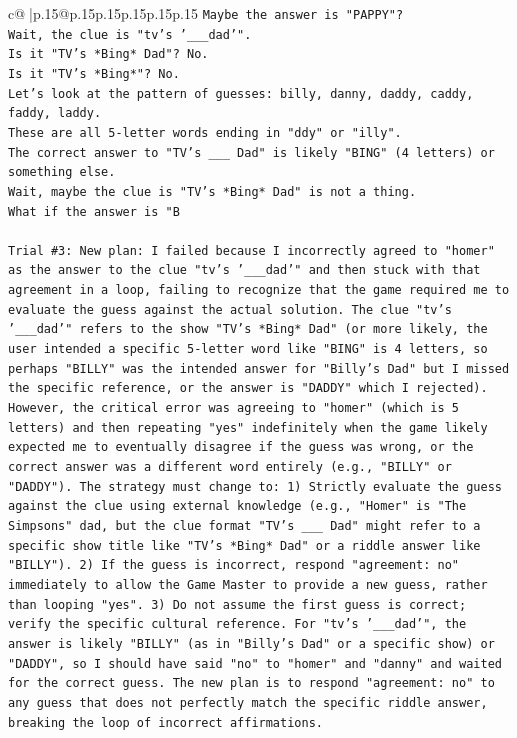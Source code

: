 \documentclass{article}
\begin{document}
{\begin{supertabular}{c@{$\;$}|p{.15\linewidth}@{}p{.15\linewidth}p{.15\linewidth}p{.15\linewidth}p{.15\linewidth}p{.15\linewidth}}
{{{\texttt{Maybe the answer is "PAPPY"?} \\
\texttt{Wait, the clue is "tv's '\_\_\_dad'".} \\
\texttt{Is it "TV's *Bing* Dad"? No.} \\
\texttt{Is it "TV's *Bing*"? No.} \\
\texttt{Let's look at the pattern of guesses: billy, danny, daddy, caddy, faddy, laddy.} \\
\texttt{These are all 5{-}letter words ending in "ddy" or "illy".} \\
\texttt{The correct answer to "TV's \_\_\_ Dad" is likely "BING" (4 letters) or something else.} \\
\texttt{Wait, maybe the clue is "TV's *Bing* Dad" is not a thing.} \\
\texttt{What if the answer is "B} \\
\\ 
\texttt{Trial \#3: New plan: I failed because I incorrectly agreed to "homer" as the answer to the clue "tv's '\_\_\_dad'" and then stuck with that agreement in a loop, failing to recognize that the game required me to evaluate the guess against the actual solution. The clue "tv's '\_\_\_dad'" refers to the show "TV's *Bing* Dad" (or more likely, the user intended a specific 5{-}letter word like "BING" is 4 letters, so perhaps "BILLY" was the intended answer for "Billy's Dad" but I missed the specific reference, or the answer is "DADDY" which I rejected). However, the critical error was agreeing to "homer" (which is 5 letters) and then repeating "yes" indefinitely when the game likely expected me to eventually disagree if the guess was wrong, or the correct answer was a different word entirely (e.g., "BILLY" or "DADDY"). The strategy must change to: 1) Strictly evaluate the guess against the clue using external knowledge (e.g., "Homer" is "The Simpsons" dad, but the clue format "TV's \_\_\_ Dad" might refer to a specific show title like "TV's *Bing* Dad" or a riddle answer like "BILLY"). 2) If the guess is incorrect, respond "agreement: no" immediately to allow the Game Master to provide a new guess, rather than looping "yes". 3) Do not assume the first guess is correct; verify the specific cultural reference. For "tv's '\_\_\_dad'", the answer is likely "BILLY" (as in "Billy's Dad" or a specific show) or "DADDY", so I should have said "no" to "homer" and "danny" and waited for the correct guess. The new plan is to respond "agreement: no" to any guess that does not perfectly match the specific riddle answer, breaking the loop of incorrect affirmations.} \\
}}}
\end{supertabular}}
\end{document}

